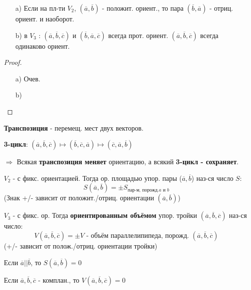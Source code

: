 \begin{statement}
\begin{itemize}
  \item [a) ] Если на пл-ти $V_2$, $(\overline{a}, \overline{b})$ - положит. ориент., то пара $(\overline{b}, \overline{a})$ - отриц. ориент. и наоборот. 
  \item [b) ] в $V_3$ : $(\overline{a}, \overline{b}, \overline{c})$ и $(\overline{b}, \overline{a}, \overline{c})$ всегда прот. ориент.
    $(\overline{a}, \overline{b}, \overline{c})$ всегда одинаково ориент.
\end{itemize}
\end{statement}
\begin{proof}
\begin{itemize}
  \item [a) ] Очев.
  \item [b) ] 
\end{itemize}
\end{proof}
\begin{definition}
\textbf{Транспозиция} - перемещ. мест двух векторов.
\end{definition}
\begin{definition}
  \textbf{3-цикл}: $(\overline{a}, \overline{b}, \overline{c}) \mapsto (\overline{b}, \overline{c}, \overline{a}) \mapsto (\overline{c}, \overline{a}, \overline{b})$
\end{definition}
\begin{note}
$\Rightarrow$ Всякая \textbf{транспозиция меняет} ориентацию, а всякий \textbf{3-цикл - сохраняет}.
\end{note}
\begin{definition}
$V_2$ - с фикс. ориентацией. Тогда ор. площадью упор. пары ($\overline{a}, \overline{b}$) наз-ся число $S$:
\[
S(\overline{a}, \overline{b}) = \pm S_{\text{пар-м, порожд}. a \text{ и } b }
\] 
(Знак +/- зависит от положит./отриц. ориентации $(\overline{a}, \overline{b})$)
\end{definition}

\begin{definition}
$V_3$ - с фикс. ор. Тогда \textbf{ориентированным объёмом} упор. тройки $(\overline{a}, \overline{b}, \overline{c})$ наз-ся число:
\[
V(\overline{a}, \overline{b}, \overline{c}) = \pm V \text{ - объём параллелипипеда, порожд. $(\overline{a}, \overline{b}, \overline{c})$}
\]
(+/- зависит от полож./отриц. ориентации тройки)
\end{definition}
\begin{note}
Если $\overline{a} || \overline{b}$, то $S(\overline{a}, \overline{b}) = 0$

Если $\overline{a}, \overline{b}, \overline{c}$ - комплан., то $V(\overline{a}, \overline{b}, \overline{c}) = 0$
\end{note}

